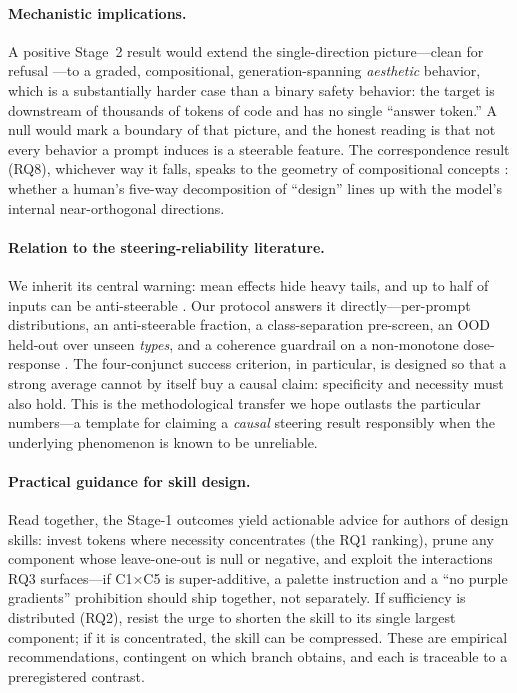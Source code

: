 \paragraph{Mechanistic implications.} A positive Stage~2 result would extend the single-direction
picture---clean for refusal \citep{arditi2024refusal}---to a graded, compositional, generation-spanning
\emph{aesthetic} behavior, which is a substantially harder case than a binary safety behavior: the
target is downstream of thousands of tokens of code and has no single ``answer token.'' A null would
mark a boundary of that picture, and the honest reading is that not every behavior a prompt induces is
a steerable feature. The correspondence result (RQ8), whichever way it falls, speaks to the geometry of
compositional concepts \citep{park2024geometry}: whether a human's five-way decomposition of ``design''
lines up with the model's internal near-orthogonal directions.

\paragraph{Relation to the steering-reliability literature.} We inherit its central warning: mean
effects hide heavy tails, and up to half of inputs can be anti-steerable
\citep{tan2024analysing,dasilva2025steeringoff}. Our protocol answers it directly---per-prompt
distributions, an anti-steerable fraction, a class-separation pre-screen, an OOD held-out over unseen
\emph{types}, and a coherence guardrail on a non-monotone dose-response
\citep{taimeskhanov2026strength}. The four-conjunct success criterion, in particular, is designed so
that a strong average cannot by itself buy a causal claim: specificity and necessity must also hold.
This is the methodological transfer we hope outlasts the particular numbers---a template for claiming a
\emph{causal} steering result responsibly when the underlying phenomenon is known to be unreliable.

\paragraph{Practical guidance for skill design.} Read together, the Stage-1 outcomes yield actionable
advice for authors of design skills: invest tokens where necessity concentrates (the RQ1 ranking),
prune any component whose leave-one-out is null or negative, and exploit the interactions RQ3
surfaces---if C1$\times$C5 is super-additive, a palette instruction and a ``no purple gradients''
prohibition should ship together, not separately. If sufficiency is distributed (RQ2), resist the urge
to shorten the skill to its single largest component; if it is concentrated, the skill can be
compressed. These are empirical recommendations, contingent on which branch obtains, and each is
traceable to a preregistered contrast.
